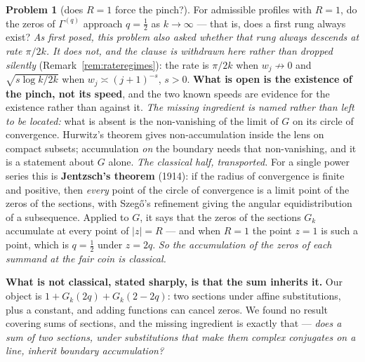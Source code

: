 \documentclass[11pt,a4paper]{article}
\theoremstyle{plain}
\theoremstyle{definition}
\newtheorem{problem}[theorem]{Problem}
\theoremstyle{remark}
\begin{document}
\begin{problem}[does $R=1$ force the pinch?]\label{prob:converse}
For admissible profiles with $R=1$, do the zeros of $\Gamma^{(q)}$ approach $q=\tfrac12$ as
$k\to\infty$ --- that is, does a first rung always exist?
\emph{As first posed, this problem also asked whether that rung always descends at rate
$\pi/2k$. It does not, and the clause is withdrawn here rather than dropped silently}
(Remark~\ref{rem:rateregimes}): the rate is $\pi/2k$ when $w_j\not\to0$ and
$\sqrt{s\log k/2k}$ when $w_j\asymp(j+1)^{-s}$, $s>0$. \textbf{What is open is the existence of the
pinch, not its speed}, and the two known speeds are evidence for the existence rather than
against it.
\emph{The missing ingredient is named rather than left to be located:} what is absent is the
non-vanishing of the limit of $G$ on its circle of convergence. Hurwitz's theorem gives
non-accumulation inside the lens on compact subsets; accumulation \emph{on} the boundary needs
that non-vanishing, and it is a statement about $G$ alone.
\emph{The classical half, transported.} For a single power series this is
\textbf{Jentzsch's theorem} (1914): if the radius of convergence is finite and positive, then
\emph{every} point of the circle of convergence is a limit point of the zeros of the sections,
with Szeg\H{o}'s refinement giving the angular equidistribution of a subsequence. Applied to
$G$, it says that the zeros of the sections $G_k$ accumulate at every point of $|z|=R$ --- and
when $R=1$ the point $z=1$ is such a point, which is $q=\tfrac12$ under $z=2q$. \emph{So the
accumulation of the zeros of each summand at the fair coin is classical.}

\textbf{What is not classical, stated sharply, is that the sum inherits it.} Our object is
$1+G_k(2q)+G_k(2-2q)$: two sections under affine substitutions, plus a constant, and adding
functions can cancel zeros. We found no result covering sums of sections, and the missing
ingredient is exactly that --- \emph{does a sum of two sections, under substitutions that make
them complex conjugates on a line, inherit boundary accumulation?}


\end{problem}
\end{document}
